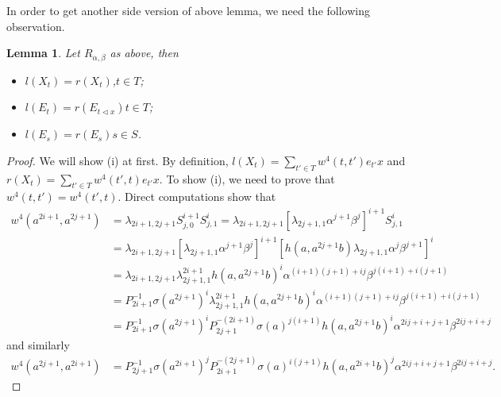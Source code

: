 \documentclass[a4paper,11pt]{amsart}
\numberwithin{equation}{section}
\newtheorem{lemma}[theorem]{Lemma}
\begin{document}
In order to get  another side version of above lemma, we need the following observation.
\begin{lemma}\label{lemm4.7}
Let $R_{\alpha,\beta}$ as above, then
\begin{itemize}
\item[(i)] $l(X_t)=r(X_t)$,\;$t\in T$;
\item[(ii)] $l(E_t)=r(E_{t\triangleleft x})$\;$t\in T$;
\item[(iii)] $l(E_s)=r(E_s)$\;$s\in S$.
\end{itemize}
\end{lemma}
\begin{proof}
We will show (i) at first. By definition, $l(X_t)=\sum_{t'\in T} w^4(t,t')e_{t'}x$ and $r(X_t)=\sum_{t'\in T} w^4(t',t)e_{t'}x$. To show (i), we need to prove that $w^4(t,t')=w^4(t',t)$. Direct computations show that
\begin{align*}
w^4(a^{2i+1},a^{2j+1})&=\lambda_{2i+1,2j+1} S_{j,0}^{i+1} S_{j,1}^i=\lambda_{2i+1,2j+1} [\lambda_{2j+1,1} \alpha^{j+1} \beta^j]^{i+1} S_{j,1}^i\\
&=\lambda_{2i+1,2j+1} [\lambda_{2j+1,1} \alpha^{j+1} \beta^j]^{i+1} [h(a,a^{2j+1}b)\lambda_{2j+1,1} \alpha^{j} \beta^{j+1}]^i\\
&=\lambda_{2i+1,2j+1} \lambda_{2j+1,1}^{2i+1} h(a,a^{2j+1}b)^i \alpha^{(i+1)(j+1)+ij} \beta^{j(i+1)+i(j+1)}\\
&=P_{2i+1}^{-1} \sigma(a^{2j+1})^i \lambda_{2j+1,1}^{2i+1} h(a,a^{2j+1}b)^i \alpha^{(i+1)(j+1)+ij} \beta^{j(i+1)+i(j+1)}\\
&=P_{2i+1}^{-1} \sigma(a^{2j+1})^i P_{2j+1}^{-(2i+1)} \sigma(a)^{j(i+1)} h(a,a^{2j+1}b)^i \alpha^{2ij+i+j+1} \beta^{2ij+i+j}
\end{align*}
and similarly
\begin{align*}
w^4(a^{2j+1},a^{2i+1})&=P_{2j+1}^{-1} \sigma(a^{2i+1})^j P_{2i+1}^{-(2j+1)} \sigma(a)^{i(j+1)} h(a,a^{2i+1}b)^j \alpha^{2ij+i+j+1} \beta^{2ij+i+j}.
\end{align*}

\end{proof}
\end{document}
